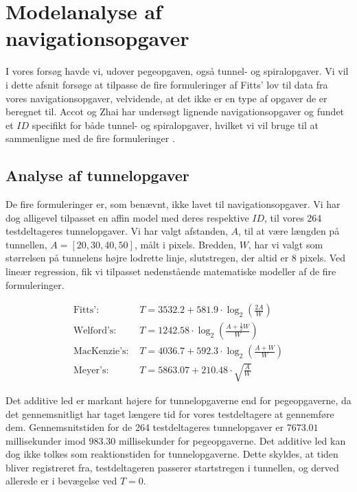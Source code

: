 \section*{Modelanalyse af navigationsopgaver}
I vores forsøg havde vi, udover pegeopgaven, også tunnel- og spiralopgaver. Vi vil i dette afsnit forsøge at tilpasse de fire formuleringer af Fitts' lov til data fra vores navigationsopgaver, velvidende, at det ikke er en type af opgaver de er beregnet til. Accot og Zhai har undersøgt lignende navigationsopgaver og fundet et $ID$ specifikt for både tunnel- og spiralopgaver, hvilket vi vil bruge til at sammenligne med de fire formuleringer \cite{accot1997}.

\subsection*{Analyse af tunnelopgaver}
De fire formuleringer er, som benævnt, ikke lavet til navigationsopgaver. Vi har dog alligevel tilpasset en affin model med deres respektive $ID$, til vores 264 testdeltageres tunnelopgaver. Vi har valgt afstanden, $A$, til at være længden på tunnellen, $A=[20,30,40,50]$, målt i pixels. Bredden, $W$, har vi valgt som størrelsen på tunnelens højre lodrette linje, slutstregen, der altid er $8$ pixels. Ved lineær regression, fik vi tilpasset nedenstående matematiske modeller af de fire formuleringer.

\begin{align*}
\text{Fitts': } &T = 3532.2 + 581.9\cdot \log_2\left(\frac{2A}{W}\right)\\
\text{Welford's: } &T =  1242.58\cdot \log_2\left(\frac{A+\frac{1}{2}W}{W}\right)\\
\text{MacKenzie's: } &T = 4036.7 + 592.3\cdot \log_2\left(\frac{A+W}{W}\right)\\
\text{Meyer's: } &T = 5863.07 + 210.48 \cdot \sqrt{\frac{A}{W}}
\end{align*}

Det additive led er markant højere for tunnelopgaverne end for pegeopgaverne, da det gennemsnitligt har taget længere tid for vores testdeltagere at gennemføre dem. Gennemsnitstiden for de 264 testdeltageres tunnelopgaver er $7673.01$ millisekunder imod $983.30$ millisekunder for pegeopgaverne. Det additive led kan dog ikke tolkes som reaktionstiden for tunnelopgaverne. Dette skyldes, at tiden bliver registreret fra, testdeltageren passerer startstregen i tunnellen, og derved allerede er i bevægelse ved $T=0$.

